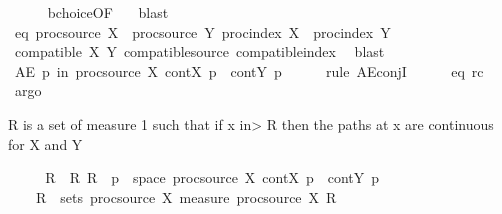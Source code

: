 \begin{isabellebody}
\ \ \ \ \isamarkupfalse%
\ bchoice{\isacharbrackleft}{\kern0pt}OF\ {}{\isacharbrackright}{\kern0pt}\ \isamarkupfalse%
\ blast\isanewline
\ \ \isamarkupfalse%
\ eq{\isacharcolon}{\kern0pt}\ {\isachardoublequoteopen}proc{\isacharunderscore}{\kern0pt}source\ X\ {\isacharequal}{\kern0pt}\ proc{\isacharunderscore}{\kern0pt}source\ Y{\isachardoublequoteclose}\ {\isachardoublequoteopen}proc{\isacharunderscore}{\kern0pt}index\ X\ {\isacharequal}{\kern0pt}\ proc{\isacharunderscore}{\kern0pt}index\ Y{\isachardoublequoteclose}\isanewline
\ \ \ \ \isamarkupfalse%
\ {\isacartoucheopen}compatible\ X\ Y{\isacartoucheclose}\ compatible{\isacharunderscore}{\kern0pt}source\ compatible{\isacharunderscore}{\kern0pt}index\ \isamarkupfalse%
\ blast{\isacharplus}{\kern0pt}\isanewline
\ \ \isamarkupfalse%
\ {\isachardoublequoteopen}AE\ p\ in\ proc{\isacharunderscore}{\kern0pt}source\ X{\isachardot}{\kern0pt}\ {\isacharquery}{\kern0pt}cont{\isacharunderscore}{\kern0pt}X\ p\ {\isasymand}\ {\isacharquery}{\kern0pt}cont{\isacharunderscore}{\kern0pt}Y\ p{\isachardoublequoteclose}\isanewline
\ \ \ \ \isamarkupfalse%
\ {\isacharparenleft}{\kern0pt}rule\ AE{\isacharunderscore}{\kern0pt}conjI{\isacharparenright}{\kern0pt}\isanewline
\ \ \ \ \isamarkupfalse%
\ eq\ rc\ \isamarkupfalse%
\ argo{\isacharplus}{\kern0pt}%
\begin{isamarkuptext}%
R is a set of measure 1 such that if x \<in> R then the paths at x are continuous for X and Y%
\end{isamarkuptext}\isamarkuptrue%
\ \ \isamarkupfalse%
\ \isamarkupfalse%
\ R\ \ R{\isacharcolon}{\kern0pt}\ {\isachardoublequoteopen}R\ {\isasymsubseteq}\ {\isacharbraceleft}{\kern0pt}p\ {\isasymin}\ space\ {\isacharparenleft}{\kern0pt}proc{\isacharunderscore}{\kern0pt}source\ X{\isacharparenright}{\kern0pt}{\isachardot}{\kern0pt}\ {\isacharquery}{\kern0pt}cont{\isacharunderscore}{\kern0pt}X\ p\ {\isasymand}\ {\isacharquery}{\kern0pt}cont{\isacharunderscore}{\kern0pt}Y\ p{\isacharbraceright}{\kern0pt}{\isachardoublequoteclose}\isanewline
\ \ \ \ {\isachardoublequoteopen}R\ {\isasymin}\ sets\ {\isacharparenleft}{\kern0pt}proc{\isacharunderscore}{\kern0pt}source\ X{\isacharparenright}{\kern0pt}{\isachardoublequoteclose}\ {\isachardoublequoteopen}measure\ {\isacharparenleft}{\kern0pt}proc{\isacharunderscore}{\kern0pt}source\ X{\isacharparenright}{\kern0pt}\ R\ {\isacharequal}{\kern0pt}\ {}{\isachardoublequoteclose}\isanewline

\end{isabellebody}
